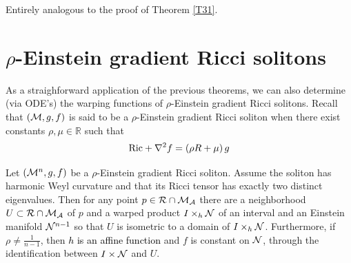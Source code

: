 \begin{demm}
	Entirely analogous to the proof of Theorem \cref{T31}.
\end{demm}





\section{$\rho$-Einstein gradient Ricci solitons}

As a straighforward application of the previous theorems, we can also determine (via ODE's) the warping functions of $\rho$-Einstein gradient Ricci solitons. 
Recall that $(\mathcal{M}, g, f)$ is said to be a $\rho$-Einstein gradient Ricci soliton when there exist constants $\rho, \mu \in \mathbb{R}$ such that 
\[ 
\mathrm{Ric} + \nabla^2 f  = \left(\rho R + \mu\right)g
\]

\begin{teorema}\label{LocalStrucRhoEinstein}
	Let $\left(\mathcal{M}^n, g, f\right)$ be a $\rho$-Einstein gradient Ricci soliton. Assume the soliton has harmonic Weyl curvature and that its Ricci tensor has exactly two distinct eigenvalues. Then for any point $p\in\mathcal{R}\cap \mathcal{M}_{\mathcal{A}}$ there are a neighborhood $U\subset\mathcal{R}\cap \mathcal{M}_{\mathcal{A}}$ of $p$ and a warped product $I \times_{h} \mathcal{N}$ of an interval and an Einstein manifold $\mathcal{N}^{n-1}$ so that $U$ is isometric to a domain of $I \times_{h} \mathcal{N}$. Furthermore, if $\rho \neq \frac{1}{n-1}$, then \textcolor{black}{$h$ is an affine function} and $f$ is constant on $\mathcal{N}$, through the identification between $I \times \mathcal{N}$ and $U$.
\end{teorema}

